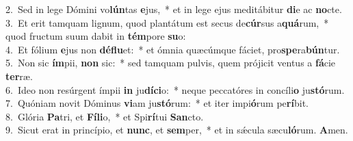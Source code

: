 {2.~}Sed in lege Dómini vo\textbf{lún}tas \textbf{e}jus,~* et in lege ejus meditábitur \textbf{di}e ac \textbf{no}cte.\\
{3.~}Et erit tamquam lignum, quod plantátum est secus de\textbf{cúr}sus a\textbf{quá}rum,~* quod fructum suum dabit in \textbf{tém}pore \textbf{su}o:\\
{4.~}Et fólium \textbf{e}jus non \textbf{dé}\textbf{flu}et:~* et ómnia quæcúmque fáciet, pro\textbf{spe}ra\textbf{bún}tur.\\
{5.~}Non sic \textbf{ím}pii, \textbf{non} sic:~* sed tamquam pulvis, quem prójicit ventus a \textbf{fá}cie \textbf{ter}ræ.\\
{6.~}Ideo non resúrgent ímpii \textbf{in} ju\textbf{dí}\textbf{ci}o:~* neque peccatóres in concíli\textbf{o} ju\textbf{stó}rum.\\
{7.~}Quóniam novit Dóminus \textbf{vi}am ju\textbf{stó}rum:~* et iter impi\textbf{ó}rum pe\textbf{rí}bit.\\
{8.~}Glória \textbf{Pa}tri, et \textbf{Fí}\textbf{li}o,~* et Spi\textbf{rí}tui \textbf{San}cto.\\
{9.~}Sicut erat in princípio, et \textbf{nunc}, et \textbf{sem}per,~* et in sǽcula sæcu\textbf{ló}rum. \textbf{A}men.\\
